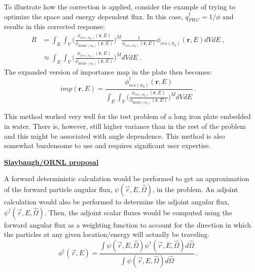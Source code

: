 \documentclass[12pt,twoside]{article}
\newcommand{\ve}[1]{\ensuremath{\mathbf{#1}}}
\newcommand{\vOmega}{\ensuremath{\hat{\Omega}}}
\begin{document}
To illustrate how the correction is applied, consider the example of trying to optimize the space and energy dependent flux. In this case, $q^{\dagger}_{FWC} = 1 / \phi$ and results in this corrected response: 
%
\begin{align}
 R &= \int_E \int_{V} \bigl(\frac{\phi_{res(\sigma_0)}(\ve{r},E)}{\phi_{dilute(\sigma_0)}(\ve{r},E)}\bigr)^M \frac{1}{\phi_{res(\sigma_0)}(\ve{r}, E)} \phi_{res(\sigma_0)}(\ve{r}, E) dV dE \:,
 \label{eq:newResponse} \\
   &\approx \int_E \int_{V} \bigl(\frac{\phi_{res(\sigma_0)}(\ve{r},E)}{\phi_{dilute(\sigma_0)}(\ve{r},E)}\bigr)^M dV dE \:. \nonumber
\end{align}
%
The expanded version of importance map in the plate then becomes:
%
\begin{equation}
 imp(\ve{r},E)= \frac{\phi_{res(\sigma_0)}^{\dagger}(\ve{r},E)}{\int_E \int_{V} \bigl(\frac{\phi_{res(\sigma_0)}(\ve{r},E)}{\phi_{dilute(\sigma_0)}(\ve{r},E)}\bigr)^M dV dE} \:.
  \label{eq:newImp}
\end{equation}

This method worked very well for the test problem of a long iron plate embedded in water. There is, however, still higher variance than in the rest of the problem and this might be associated with angle dependence. This method is also somewhat burdensome to use and requires significant user expertise. 


\vspace*{3em}
\begin{center}
\underline{\textbf{Slaybaugh/ORNL proposal}} \cite{Slaybaugh2014}
\end{center}

A forward deterministic calculation would be performed to get an approximation of the forward particle angular flux, $\psi(\vec{r},E,\vOmega)$, in the problem.  An adjoint calculation would also be performed to determine the adjoint angular flux,$\psi^{\dagger}(\vec{r},E,\vOmega)$.  Then, the adjoint scalar fluxes would be computed using the forward angular flux as a weighting function to account for the direction in which the particles at any given location/energy will actually be traveling.
\begin{equation}
  \phi^{\dagger}(\vec{r},E) = \frac{\int \psi(\vec{r},E,\vOmega) \psi^{\dagger}(\vec{r},E,\vOmega) d\vOmega}{\int \psi(\vec{r},E,\vOmega) d\vOmega} \:.
\end{equation}
\end{document}
